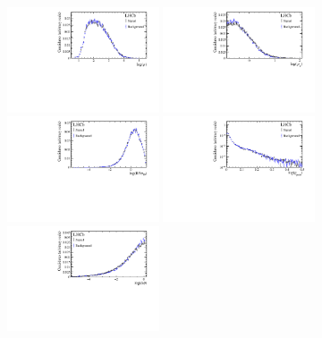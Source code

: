 \begin{figure}[tbp]
	\begin{center}
		\includegraphics[width=0.40\textwidth]{08FlavourTagging/figs/BDT_P_flat_log.pdf}
		\includegraphics[width=0.40\textwidth]{08FlavourTagging/figs/BDT_Pt_flat_log.pdf}\\
		\includegraphics[width=0.40\textwidth]{08FlavourTagging/figs/BDT_TagPart_IPsig_BENDVERTEX_log.pdf}
		\includegraphics[width=0.40\textwidth]{08FlavourTagging/figs/BDT_gprob_flat.pdf}\\
		\includegraphics[width=0.40\textwidth]{08FlavourTagging/figs/BDT_dphi_flat_log.pdf}

\end{center}
\end{figure}
